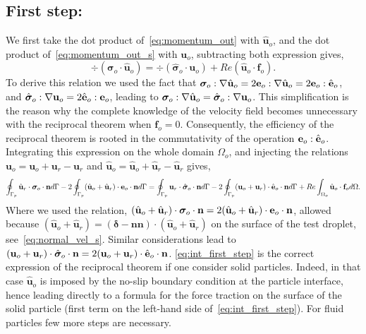 \subsection{First step:}
We first take the dot product of~\ref{eq:momentum_out} with $\hat{\textbf{u}}_{o}$, and the dot product of~\ref{eq:momentum_out_s} with $\textbf{u}_{o}$, subtracting both expression gives, 
\begin{equation}
    \div (\bm\sigma_{o}\cdot \hat{\textbf{u}}_o)
    =
    \div (\hat{\bm\sigma}_{o}\cdot \textbf{u}_o)
    + Re (\hat{\textbf{u}}_{o}\cdot \textbf{f}_{o}). 
    \label{eq:first_step_out}
\end{equation}
To derive this relation we used the fact that $\bm\sigma_o :\mathbf{\nabla} \hat{\textbf{u}}_o = 2\textbf{e}_o :\mathbf{\nabla} \hat{\textbf{u}}_o = 2{\textbf e}_o : \hat{\textbf e}_o$, and  $\hat{\bm\sigma}_o :\mathbf{\nabla} {\textbf{u}}_o = 2\hat{\textbf{e}}_o : \textbf{e}_o$, leading to $\bm\sigma_o :\mathbf{\nabla} \hat{\textbf{u}}_o = \hat{\bm\sigma}_o :\mathbf{\nabla} {\textbf{u}}_o$. 
This simplification is the reason why the complete knowledge of the velocity field becomes unnecessary with the reciprocal theorem when $\textbf{f}_o = 0$.
Consequently, the  efficiency of the reciprocal theorem is rooted in the commutativity of the operation $\textbf e_o:\hat{\textbf e}_o$. 
Integrating this expression on the whole domain $\Omega_{o}$, and injecting the relations $\textbf{u}_o = \textbf{u}_o+\textbf{u}_r-\textbf{u}_r$ and $\hat{\textbf{u}}_o = \hat{\textbf{u}}_o+\hat{\textbf{u}}_r-\hat{\textbf{u}}_r$ gives, 
\begin{equation}
    \intS[p]{\hat{\textbf{u}}_{r} \cdot  \bm\sigma_{o}\cdot \textbf{n}}
    - 2\intS[p]{(\hat{\textbf{u}}_{o} + \hat{\textbf{u}}_r) \cdot  \textbf e_{o}\cdot \textbf{n}}
    =
    \intS[p]{\textbf{u}_{r}\cdot \hat{\bm\sigma}_{o}\cdot \textbf{n}}
    - 2\intS[p]{(\textbf{u}_{o} + \textbf{u}_r)\cdot \hat{\textbf e}_{o}\cdot \textbf{n}}
    + 
    Re\intO[o]{\hat{\textbf{u}}_{o}\cdot \textbf{f}_{o}}.
    \label{eq:int_first_step}
\end{equation}
Where we used the relation, $(\hat{\textbf{u}}_{o} + \hat{\textbf{u}}_r) \cdot  \bm\sigma_{o}\cdot \textbf{n} = 2 (\hat{\textbf{u}}_{o} + \hat{\textbf{u}}_r) \cdot  \textbf e_{o}\cdot \textbf{n}$, allowed  because $(\hat{\textbf{u}}_{o} + \hat{\textbf{u}}_r) = (\bm\delta - \textbf{nn})\cdot (\hat{\textbf{u}}_{o} + \hat{\textbf{u}}_r)$ on the surface of the test droplet, see~\ref{eq:normal_vel_s}. 
Similar considerations lead to $({\textbf{u}}_{o} + {\textbf{u}_r}) \cdot  \hat{\bm\sigma}_{o}\cdot \textbf{n} =2  ({\textbf{u}}_{o} + {\textbf{u}_r}) \cdot  \hat{\textbf e}_{o}\cdot \textbf{n}$. 
\ref{eq:int_first_step} is the correct expression of the reciprocal theorem if one consider solid particles.
Indeed, in that case $\hat{\textbf{u}}_{o}$ is imposed by the no-slip boundary condition at the particle interface, hence leading directly to a formula for the force traction on the surface of the solid particle (first term on the left-hand side of~\ref{eq:int_first_step}). 
For fluid particles few more steps are necessary. 

